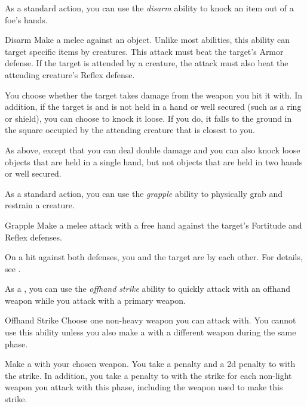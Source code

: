          As a standard action, you can use the \textit{disarm} ability to knock an item out of a foe's hands.

        \begin{freeability}{Disarm}\label{Disarm}
            Make a melee  against an object.
            Unlike most abilities, this ability can target specific items  by creatures.
            This attack must beat the target's Armor defense.
            If the target is attended by a creature, the attack must also beat the attending creature's Reflex defense.

            \hit You choose whether the target takes damage from the weapon you hit it with.
            In addition, if the target is  and is not held in a hand or well secured (such as a ring or shield), you can choose to knock it loose.
            If you do, it falls to the ground in the square occupied by the attending creature that is closest to you.

            \crit As above, except that you can deal double damage and you can also knock loose objects that are held in a single hand, but not objects that are held in two hands or well secured.
        \end{freeability}

         As a standard action, you can use the \textit{grapple} ability to physically grab and restrain a creature.

        \begin{freeability}{Grapple}\label{Grapple}
            Make a melee attack with a free hand against the target's Fortitude and Reflex defenses.

            On a hit against both defenses, you and the target are \grappled by each other.
            For details, see .
        \end{freeability}

        \label{Offhand Strike} As a , you can use the \textit{offhand strike} ability to quickly attack with an offhand weapon while you attack with a primary weapon.
        \begin{freeability}{Offhand Strike}
            Choose one non-heavy weapon you can attack with.
            You cannot use this ability unless you also make a  with a different weapon during the same phase.

            Make a  with your chosen weapon.
            You take a  penalty  and a \minus2d penalty to  with the strike.
            In addition, you take a  penalty to  with the strike for each non-light weapon you attack with this phase, including the weapon used to make this strike.
        \end{freeability}

